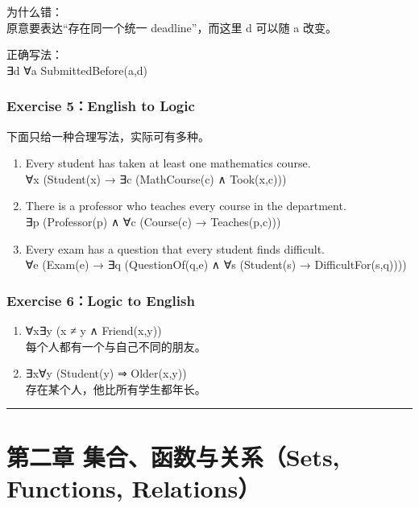 \documentclass[
  11pt,
]{article}
\begin{document}
为什么错：\\
原意要表达``存在同一个统一 deadline''，而这里 d 可以随 a 改变。

正确写法：\\
∃d ∀a SubmittedBefore(a,d)

\subsubsection{Exercise 5：English to
Logic}\label{exercise-5english-to-logic}

下面只给一种合理写法，实际可有多种。

\begin{enumerate}
\def\labelenumi{\arabic{enumi}.}
\item
  Every student has taken at least one mathematics course.\\
  ∀x (Student(x) → ∃c (MathCourse(c) ∧ Took(x,c)))
\item
  There is a professor who teaches every course in the department.\\
  ∃p (Professor(p) ∧ ∀c (Course(c) → Teaches(p,c)))
\item
  Every exam has a question that every student finds difficult.\\
  ∀e (Exam(e) → ∃q (QuestionOf(q,e) ∧ ∀s (Student(s) →
  DifficultFor(s,q))))
\end{enumerate}

\subsubsection{Exercise 6：Logic to
English}\label{exercise-6logic-to-english}

\begin{enumerate}
\def\labelenumi{\arabic{enumi}.}
\item
  ∀x∃y (x ≠ y ∧ Friend(x,y))\\
  每个人都有一个与自己不同的朋友。
\item
  ∃x∀y (Student(y) ⇒ Older(x,y))\\
  存在某个人，他比所有学生都年长。
\end{enumerate}

\begin{center}\rule{0.5\linewidth}{0.5pt}\end{center}

\section{第二章 集合、函数与关系（Sets, Functions,
Relations）}\label{ux7b2cux4e8cux7ae0-ux96c6ux5408ux51fdux6570ux4e0eux5173ux7cfbsets-functions-relations}
\end{document}

